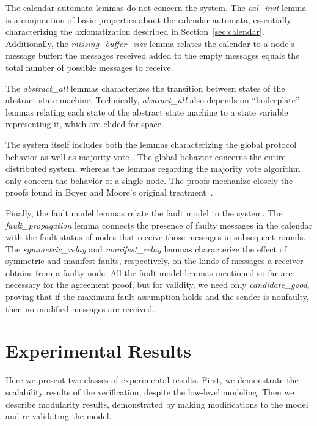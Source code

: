 \documentclass{llncs/llncs}
\newcommand{\lee}[1]{ } %
\newcommand{\lee}[1]{ {\color{blue}$<$lee: #1$>$} } %
\begin{document}
The calendar automata lemmas do not concern the system. The \emph{cal\_invt} lemma is a conjunction of basic properties about the calendar automata, essentially characterizing the axiomatization described in Section~\ref{sec:calendar}. Additionally, the \emph{missing\_buffer\_size} lemma relates the calendar to a node's message buffer: the messages received added to the empty messages equals the total number of possible messages to receive.

The \emph{abstract\_all} lemmas characterizes the transition between states of the abstract state machine. Technically, \emph{abstract\_all} also depends on ``boilerplate'' lemmas relating each state of the abstract state machine to a state variable representing it, which are elided for space.

The system itself includes both the lemmas characterizing the global protocol behavior as well as majority vote\lee{have we talked about the voting algorithm earlier?}. The global behavior concerns the entire distributed system, whereas the lemmas regarding the majority vote algorithm only concern the behavior of a single node. The proofs mechanize closely the proofs found in Boyer and Moore's original treatment~\cite{}.

Finally, the fault model lemmas relate the fault model to the system. The \emph{fault\_propagation} lemma connects the presence of faulty messages in the calendar with the fault status of nodes that receive those messages in subsequent rounds. The \emph{symmetric\_relay} and \emph{manifest\_relay} lemmas characterize the effect of symmetric and manifest faults, respectively, on the kinds of messages a receiver obtains from a faulty node. All the fault model lemmas mentioned so far are necessary for the agreement proof, but for validity, we need only \emph{candidate\_good}, proving that if the maximum fault assumption holds and the sender is nonfaulty, then no modified messages are received.

\section{Experimental Results}\label{sec:experimental}

Here we present two classes of experimental results. First, we demonstrate the scalability results of the verification, despite the low-level modeling. Then we describe modularity results, demonstrated by making modifications to the model and re-validating the model.
\end{document}
